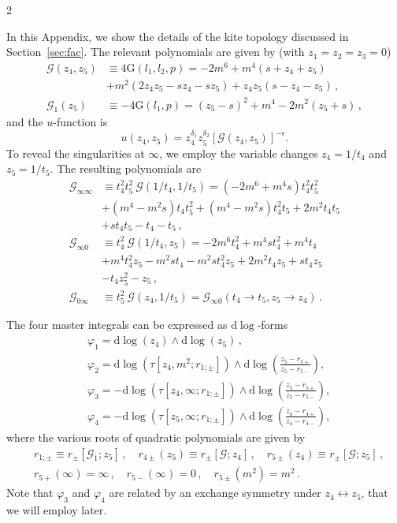 \documentclass[fleqn]{2023SCGE}
\newcommand{\nn}{\nonumber}
\newcommand{\nd}{\mathrm{d}}
\newcommand{\mG}{\mathcal{G}}
\newcommand{\nG}{\mathrm{G}}
\begin{document}
\begin{multicols}{2}
\begin{appendix}
In this Appendix, we show the details of the kite topology discussed in Section~\ref{sec:fac}. The relevant polynomials are given by (with $z_1=z_2=z_3=0$)
\begin{align}
\mG(z_4,z_5) &\equiv 4\nG(l_1,l_2,p) = - 2m^6 + m^4 (s + z_4 + z_5) \nn\\
&+ m^2 (2 z_4 z_5 - s z_4 - s z_5) + z_4 z_5 (s-z_4-z_5) \,, \nn
\\
\mG_1(z_5) &\equiv -4\nG(l_1,p) = (z_5-s)^2+m^4-2m^2(z_5+s) \,,
\end{align}
and the $u$-function is
\begin{equation}
    u(z_4,z_5) = z_4^{\delta_1} z_5^{\delta_2} \left[ \mG(z_4,z_5) \right]^{-\epsilon} .
\end{equation}
To reveal the singularities at $\infty$, we employ the variable changes $z_4=1/t_4$ and $z_5=1/t_5$. The resulting polynomials are
\begin{align}
\mG_{\infty \infty } &\equiv t_4^2t_5^2\  \mG\left(1/t_4,1/t_5\right) = (-2 m^6 +m^4 s )t_4^2 t_5^2 \nn\\ & 
+(m^4 -m^2 s) t_4 t_5^2 + (m^4 -m^2 s) t_4^2 t_5+2 m^2 t_4 t_5 \nn\\ &
+s t_4 t_5-t_4-t_5 \,,\nn\\
\mG_{\infty 0} &\equiv t_4^2\  \mG\left(1/t_4,z_5\right)=-2 m^6 t_4^2 +m^4 s t_4^2+m^4 t_4 \nn\\ & 
+m^4 t_4^2 z_5-m^2 s t_4-m^2 s t_4^2 z_5+2 m^2 t_4 z_5+s t_4 z_5 \nn\\ &
-t_4 z_5^2-z_5 \,,\nn\\
\mG_{0\infty } &\equiv t_5^2\  \mG\left(z_4,1/t_5\right) =\mG_{\infty 0}(t_4 \to t_5, z_5 \to z_4) \,.
\label{eq:Ginf}
\end{align}

The four master integrals can be expressed as $\nd \log$-forms
\begin{align}
	&\varphi_{1}=\nd \log(z_4)\wedge\nd \log(z_5) \,, \nn\\
	&\varphi_{2}=\nd \log(\tau[z_4,m^2;r_{1;\pm}])\wedge\nd \log\left(\frac{z_5-r_{5+}}{z_5-r_{5-}}\right) , \nn\\
	&\varphi_{3}=-\nd \log(\tau[z_4,\infty;r_{1;\pm}])\wedge\nd \log\left(\frac{z_5-r_{5+}}{z_5-r_{5-}}\right) , \nn\\
	&\varphi_{4}=-\nd \log(\tau[z_5,\infty;r_{1;\pm}])\wedge\nd \log\left(\frac{z_4-r_{4+}}{z_4-r_{4-}}\right),  \label{eq:dlog}
\end{align}
where the various roots of quadratic polynomials are given by
\begin{align}  
	&r_{1;\pm}\equiv  r_{\pm}[\mG_1;z_5] \,, \quad r_{4\pm}(z_5)\equiv r_{\pm}[\mG;z_4]\,, \quad r_{5\pm}(z_4)\equiv r_{\pm}[\mG;z_5]\,, \nn\\
    &r_{5+}(\infty)=\infty \,, \quad r_{5-}(\infty)=0 \,, \quad r_{5\pm}(m^2)=m^2 \,.\label{eq:polevalue}
\end{align}
Note that $\varphi_3$ and $\varphi_4$ are related by an exchange symmetry under $z_4 \leftrightarrow z_5$, that we will employ later.


\end{appendix}
\end{multicols}
\end{document}
